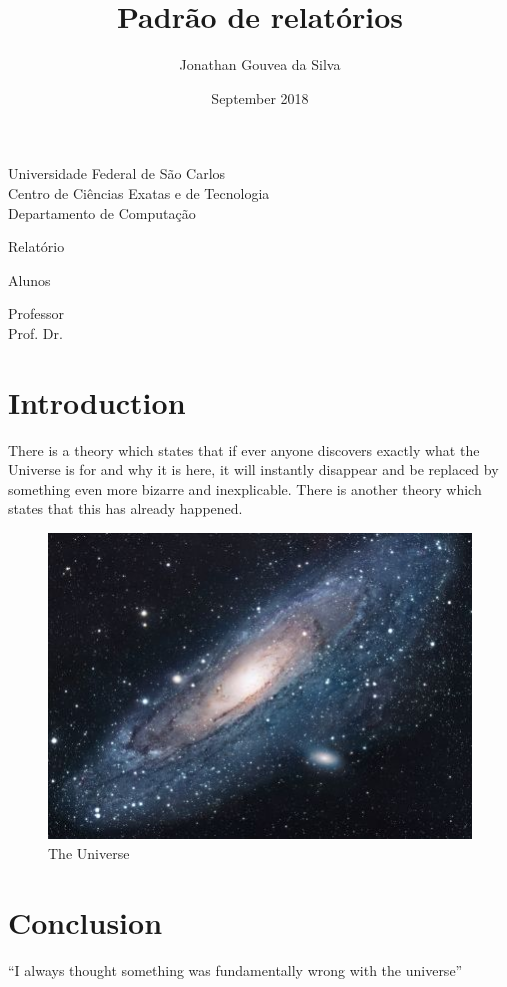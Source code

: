 \documentclass[12pt,a4paper,notitlepage]{report}
\title{Padrão de relatórios}
\author{Jonathan Gouvea da Silva}
\date{September 2018}
\begin{document}
\makeatletter
\begin{titlepage}
	\centering
	{\normalsize Universidade Federal de São Carlos\\Centro de Ciências Exatas e de Tecnologia\\Departamento de Computação}
    
	\vspace{4cm}
    {\LARGE \@title}
    
    \vspace{1em}
	{\normalsize Relatório}
    
    \vspace{5em}
    {\large Alunos\\}
    {\normalsize \@author}
    
    \vspace{4em}
    {\large Professor\\}
    {\normalsize Prof. Dr. }
	
    \vfill
    {\normalsize \@date}
\end{titlepage}
\makeatother

\tableofcontents
\clearpage
\listoffigures
\clearpage


\section{Introduction}
There is a theory which states that if ever anyone discovers exactly what the Universe is for and why it is here, it will instantly disappear and be replaced by something even more bizarre and inexplicable.
There is another theory which states that this has already happened.

\begin{figure}[H]
\centering
\includegraphics[scale=1.7]{universe}
\caption{The Universe}
\label{fig:universe}
\end{figure}

\section{Conclusion}
``I always thought something was fundamentally wrong with the universe'' \citep{adams1995hitchhiker}



\clearpage
\end{document}
